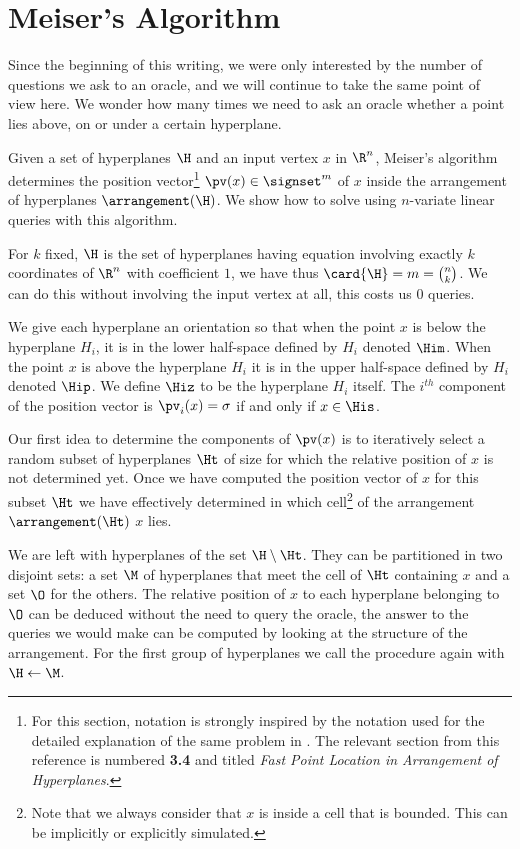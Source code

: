 \section{Meiser's Algorithm}

Since the beginning of this writing, we were only interested by the number of
questions we ask to an oracle, and we will continue to take the same point of
view here. We wonder how many times we need to ask an oracle whether a point
lies above, on or under a certain hyperplane.

Given a set of hyperplanes \(\H\) and an input vertex \(x\) in \(\R^n\),
Meiser's algorithm \cite{meiser:1993} determines the position vector\footnote{
For this section, notation is strongly inspired by the notation
used for the detailed explanation of the same problem in \citet*{burgisser:1997}.
The relevant section from this reference is numbered \textbf{3.4} and titled
\emph{Fast Point Location in Arrangement of Hyperplanes}.
}
$\pv(x) \in
\signset^{m}$ of $x$ inside the
arrangement of hyperplanes $\arrangement(\H)$.
We show how to solve \kSUM using  $n$-variate
linear queries with this algorithm.

For \(k\) fixed,
\(\H\) is the set of hyperplanes having equation involving exactly $k$
coordinates of $\R^n$ with coefficient $1$, we have thus $\card{\H} = m =
\binom{n}{k}$. We can do this without involving the input vertex at all, this
costs us $0$ queries.

We give each hyperplane an orientation so that when the point $x$ is below
the
hyperplane $H_i$, it is in the lower half-space defined by $H_i$ denoted
$\Him$. When the point $x$ is above the hyperplane $H_i$ it is in the upper
half-space defined by $H_i$ denoted $\Hip$. We define $\Hiz$ to be the
hyperplane $H_i$ itself. The $i^{th}$ component of the position vector is
$\pv_i(x) = \sigma$ if and only if $x \in \His$.

Our first idea to determine the components of $\pv(x)$ is to iteratively
select a random subset of hyperplanes \(\Ht\) of size 
for which the relative position of $x$ is not
determined yet. Once we have
computed the position vector of \(x\) for this subset \(\Ht\)
we have effectively determined in
which cell\footnote{Note that we always consider that \(x\) is inside a cell that is bounded.
This can be implicitly or explicitly simulated.}
of the arrangement $\arrangement(\Ht)$ $x$ lies.

We are left with hyperplanes of the set $\H \setminus \Ht$. They can be
partitioned in two disjoint sets: a set $\M$ of hyperplanes that meet the cell of
$\Ht$ containing $x$ and a set $\O$ for the others. The relative position of $x$
to each hyperplane belonging to $\O$ can be deduced without the need to query
the oracle, the answer to the queries we would make can be computed by looking
at the structure of the arrangement. For the first group of hyperplanes
we call the procedure again with $\H \gets \M$.

